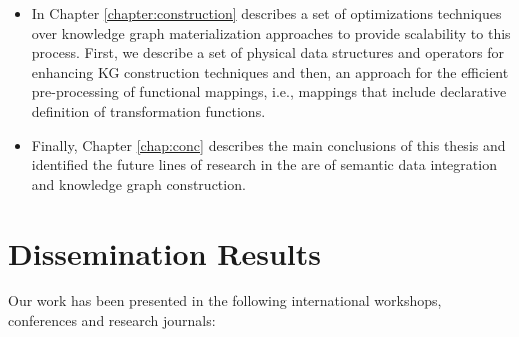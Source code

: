 \begin{itemize}
    \item In Chapter \ref{chapter:construction} describes a set of optimizations techniques over knowledge graph materialization approaches to provide scalability to this process. First, we describe a set of physical data structures and operators for enhancing KG construction techniques and then, an approach for the efficient pre-processing of functional mappings, i.e., mappings that include declarative definition of transformation functions.
    \item Finally, Chapter \ref{chap:conc} describes the main conclusions of this thesis and identified the future lines of research in the are of semantic data integration and knowledge graph construction.
\end{itemize}


\section{Dissemination Results}
\label{sec:disresults}

Our work has been presented in the following international workshops, conferences and research journals:

